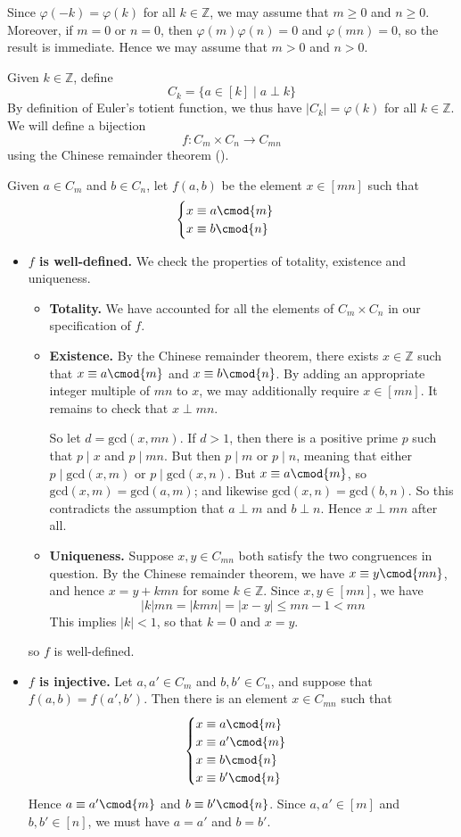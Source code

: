 \begin{cproof}
Since $\varphi(-k)=\varphi(k)$ for all $k \in \mathbb{Z}$, we may assume that $m \ge 0$ and $n \ge 0$. Moreover, if $m=0$ or $n=0$, then $\varphi(m)\varphi(n)=0$ and $\varphi(mn)=0$, so the result is immediate. Hence we may assume that $m>0$ and $n>0$.

Given $k \in \mathbb{Z}$, define
\[ C_k = \{ a \in [k] \mid a \perp k \} \]
By definition of Euler's totient function, we thus have $|C_k| = \varphi(k)$ for all $k \in \mathbb{Z}$. We will define a bijection
\[ f : C_m \times C_n \to C_{mn} \]
using the Chinese remainder theorem ().

Given $a \in C_m$ and $b \in C_n$, let $f(a, b)$ be the element $x \in [mn]$ such that
\[ \begin{cases} x \equiv a \cmod{m} \\ x \equiv b \cmod{n} \end{cases} \]
\begin{itemize}
\item \textbf{$f$ is well-defined.} We check the properties of totality, existence and uniqueness.
\begin{itemize}
\item \textbf{Totality.} We have accounted for all the elements of $C_m \times C_n$ in our specification of $f$.
\item \textbf{Existence.} By the Chinese remainder theorem, there exists $x \in \mathbb{Z}$ such that $x \equiv a \cmod{m}$ and $x \equiv b \cmod{n}$. By adding an appropriate integer multiple of $mn$ to $x$, we may additionally require $x \in [mn]$. It remains to check that $x \perp mn$.

So let $d=\mathrm{gcd}(x,mn)$. If $d>1$, then there is a positive prime $p$ such that $p \mid x$ and $p \mid mn$. But then $p \mid m$ or $p \mid n$, meaning that either $p \mid \mathrm{gcd}(x,m)$ or $p \mid \mathrm{gcd}(x,n)$. But $x \equiv a \cmod{m}$, so $\mathrm{gcd}(x,m) = \mathrm{gcd}(a,m)$; and likewise $\mathrm{gcd}(x,n) = \mathrm{gcd}(b,n)$. So this contradicts the assumption that $a \perp m$ and $b \perp n$. Hence $x \perp mn$ after all.
\item \textbf{Uniqueness.} Suppose $x,y \in C_{mn}$ both satisfy the two congruences in question. By the Chinese remainder theorem, we have $x \equiv y \cmod{mn}$, and hence $x=y+kmn$ for some $k \in \mathbb{Z}$. Since $x,y \in [mn]$, we have
\[ |k|mn = |kmn| = |x-y| \le mn-1 < mn \]
This implies $|k| < 1$, so that $k=0$ and $x=y$.
\end{itemize}
so $f$ is well-defined.
\item \textbf{$f$ is injective.} Let $a,a' \in C_m$ and $b,b' \in C_n$, and suppose that $f(a,b)=f(a',b')$. Then there is an element $x \in C_{mn}$ such that
\[ \begin{cases} x \equiv a \cmod{m} \\ x \equiv a' \cmod{m} \\ x \equiv b \cmod{n} \\ x \equiv b' \cmod{n} \end{cases} \]
Hence $a \equiv a' \cmod{m}$ and $b \equiv b' \cmod{n}$. Since $a,a' \in [m]$ and $b,b' \in [n]$, we must have $a=a'$ and $b=b'$.


\end{itemize}
\end{cproof}
